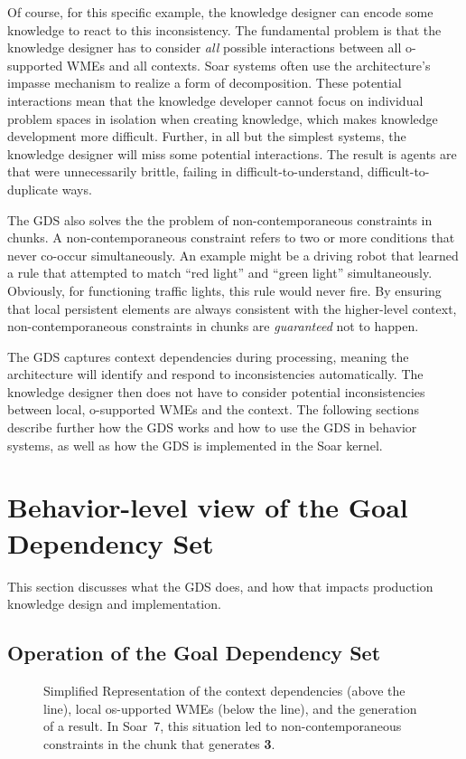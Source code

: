 Of course, for this specific example, the knowledge designer can
encode some knowledge to react to this inconsistency.  The fundamental
problem is that the knowledge designer has to consider \emph{all}
possible interactions between all o-supported WMEs and all contexts.
Soar systems often use the architecture's impasse mechanism to realize
a form of decomposition.  These potential interactions mean that the
knowledge developer cannot focus on individual problem spaces in isolation when
creating knowledge, which makes knowledge development more difficult.
Further, in all but the simplest systems, the knowledge designer will
miss some potential interactions.  The result is agents are that were
unnecessarily brittle, failing in difficult-to-understand,
difficult-to-duplicate ways.  

The GDS also solves the the problem of non-contemporaneous constraints
in chunks.  A non-contemporaneous constraint refers to two or more
conditions that never co-occur simultaneously.  An example might be a
driving robot that learned a rule that attempted to match ``red
light'' and ``green light'' simultaneously. Obviously, for functioning
traffic lights, this rule would never fire.  By ensuring that local
persistent elements are always consistent with the higher-level
context, non-contemporaneous constraints in chunks are
\emph{guaranteed} not to happen.


The GDS captures context dependencies during processing, meaning the
architecture will identify and respond to inconsistencies
automatically.  The knowledge designer then does not have to consider
potential inconsistencies between local, o-supported WMEs and the
context.  The following sections describe further how the GDS works
and how to use the GDS in behavior systems, as well as how the GDS is
implemented in the Soar kernel.


\section*{Behavior-level view of the Goal Dependency Set}

This section discusses what the GDS does, and how that impacts
production knowledge design and implementation.

\subsection*{Operation of the Goal Dependency Set}


\begin{figure}
\caption{Simplified Representation of the context dependencies (above the line), local os-upported WMEs (below the line), and the generation of a result.  In Soar~7, this situation led to non-contemporaneous constraints in the chunk that generates {\bf 3}.}
\label{'ncc'}
\end{figure}


